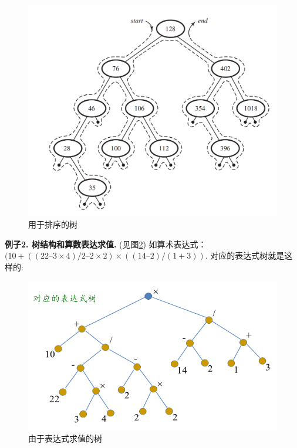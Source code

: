 \begin{figure}[h!]
	\centering
	\includegraphics[scale=0.8]{4-programs/figs/tree-sort.png}
	\caption{用于排序的树}
	\label{figs:tree-sort}
	
\end{figure}

\textbf{例子2. 树结构和算数表达求值. }(见图\ref{figs:tree-eval}) 如算术表达式：$(10 + (( 22 – 3 \times 4) / 2 – 2 \times 2 ) \times (( 14 – 2) / (1 + 3 ) )$. 对应的表达式树就是这样的: 

\begin{figure}[h!]
	\centering
	\includegraphics[scale=0.8]{4-programs/figs/exptree}
	\caption{由于表达式求值的树}
	\label{figs:tree-eval}
	
\end{figure}


